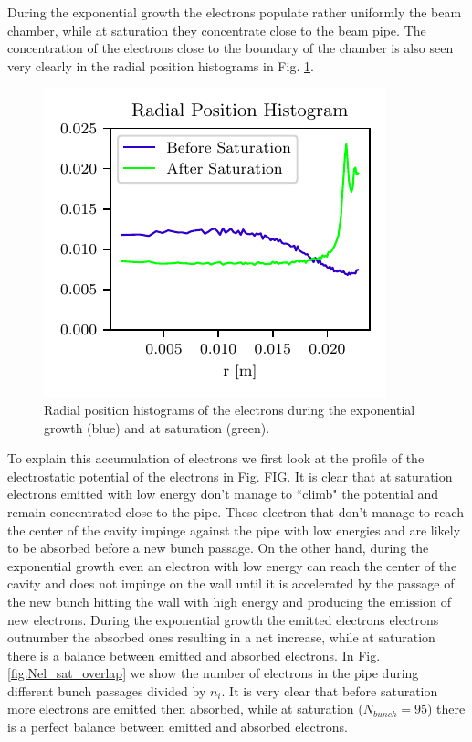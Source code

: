 During the exponential growth the electrons populate rather uniformly the beam chamber, while at saturation they concentrate close to the beam pipe. The concentration of the electrons close to the boundary of the chamber is also seen very clearly in the radial position histograms in Fig. \ref{fig:hist_r_sat}.
\begin{figure}
    \centering
    \includegraphics[scale=1.4]{chapters/Chapter1/Figures/hist_r.pdf}
    \caption{Radial position histograms of the electrons during the exponential growth (blue) and at saturation (green).}
    \label{fig:hist_r_sat}
\end{figure}
To explain this accumulation of electrons we first look at the profile of the electrostatic potential of the electrons in Fig. FIG. It is clear that at saturation electrons emitted with low energy don't manage to ``climb" the potential and remain concentrated close to the pipe. These electron that don't manage to reach the center of the cavity impinge against the pipe with low energies and are likely to be absorbed before a new bunch passage.
On the other hand, during the exponential growth even an electron with low energy can reach the center of the cavity and does not impinge on the wall until it is accelerated by the passage of the new bunch hitting the wall with high energy and producing the emission of new electrons. During the exponential growth the emitted electrons electrons outnumber the absorbed ones resulting in a net increase, while at saturation there is a balance between emitted and absorbed electrons. In Fig. \ref{fig:Nel_sat_overlap} we show the number of electrons in the pipe during different bunch passages divided by $n_i$. It is very clear that before saturation more electrons are emitted then absorbed, while at saturation ($N_{bunch}=95$) there is a perfect balance between emitted and absorbed electrons. 
